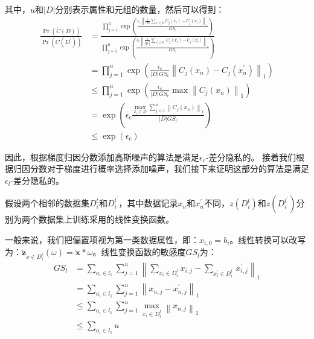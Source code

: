 其中，$u$和$|D|$分别表示属性和元组的数量，然后可以得到：
\begin{equation}\label{贡献数量和元组}
\begin{aligned}
\frac{\operatorname{Pr}(\ddot{C}(D))}{\operatorname{Pr}\left(\ddot{C}\left(D^{\prime}\right)\right)} &=\frac{\prod_{j=1}^{u} \exp \left(\frac{\epsilon_{c}\left\|\frac{1}{|D|} \sum_{x_{i} \in D} C_{j}\left(x_{i}\right)-\ddot{C}_{j}\left(x_{i}\right)\right\|_{1}}{G S_{c}}\right)}{\prod_{j=1}^{u} \exp \left(\frac{\epsilon_{c}\left\|\frac{1}{\left|D^{\prime}\right|} \sum_{x_{i}^{\prime} \in D^{\prime}} C_{j}\left(x_{i}^{\prime}\right)-\ddot{C}_{j}\left(x_{i}^{\prime}\right)\right\|_{1}}{G S_{c}}\right)} \\
&=\prod_{j=1}^{u} \exp \left(\frac{\epsilon_{c}}{|D| G S_{c}}\left\|C_{j}\left(x_{n}\right)-C_{j}\left(x_{n}^{\prime}\right)\right\|_{1}\right) \\
& \leq \prod_{j=1}^{u} \exp \left(\frac{\epsilon_{c}}{|D| G S_{c}} \max \left\|C_{j}\left(x_{n}\right)\right\|_{1}\right) \\
&=\exp \left(\epsilon_{c} \frac{\max _{x_{i} \in D} \sum_{j=1}^{u}\left\|C_{j}\left(x_{n}\right)\right\|_{1}}{|D| G S_{c}}\right) \\
& \leq \exp \left(\epsilon_{c}\right)
\end{aligned}
\end{equation}

因此，根据梯度归因分数添加高斯噪声的算法是满足$\epsilon_{c}$-差分隐私的。
接着我们根据归因分数对于梯度进行概率选择添加噪声，我们接下来证明这部分的算法是满足$\epsilon_{l}$-差分隐私的。

假设两个相邻的数据集$D_{i}^{t}$和$D_{i}^{t^{\prime}}$，其中数据记录$x_{n}$和$x_{n}^{\prime}$不同，$z\left(D_{i}^{t}\right)$和$z\left(D_{i}^{t^{\prime}}\right)$分别为两个数据集上训练采用的线性变换函数。

一般来说，我们把偏置项视为第一类数据属性，即：$x_{i,0}=b_{i}$。线性转换可以改写为：$\ddot{\mathbf{z}}_{x \in D_{i}^{t}}(\omega)=\ddot{\mathbf{x}} * \omega$。线性变换函数的敏感度$G S_{l}$为：
\begin{equation}
\begin{aligned}
G S_{l} &=\sum_{a_{i} \in l_{1}} \sum_{j=1}^{u}\left\|\sum_{x_{i} \in D_{i}^{t}} x_{i, j}-\sum_{x_{i}^{\prime} \in D_{i}^{t^{\prime}}} x_{i, j}^{\prime}\right\|_{1} \\
&=\sum_{a_{i} \in l_{1}} \sum_{j=1}^{u}\left\|x_{n, j}-x_{n, j}^{\prime}\right\|_{1} \\
& \leq \sum_{a_{i} \in l_{1}} \sum_{j=1}^{u} \max _{x_{i} \in D_{i}^{t}}\left\|x_{n, j}\right\|_{1} \\
& \leq \sum_{a_{i} \in l_{1}} u
\end{aligned}
\end{equation}

